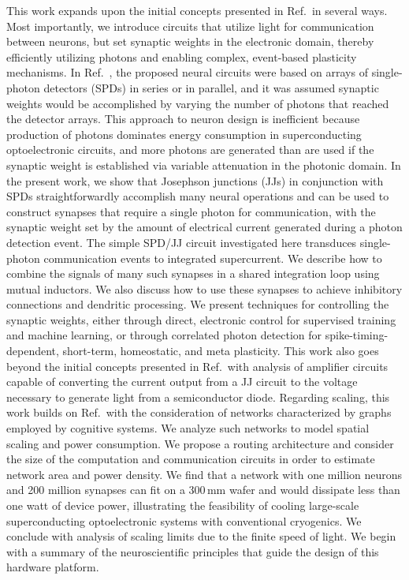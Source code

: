\documentclass[twocolumn]{article}
\newcommand{\onlinecite}[1]{\hspace{-1 ex} \nocite{#1}\citenum{#1}}
\begin{document}
This work expands upon the initial concepts presented in Ref.\,\onlinecite{shbu2017} in several ways. Most importantly, we introduce circuits that utilize light for communication between neurons, but set synaptic weights in the electronic domain, thereby efficiently utilizing photons and enabling complex, event-based plasticity mechanisms. In Ref.\,\onlinecite{shbu2017}, the proposed neural circuits were based on arrays of single-photon detectors (SPDs) in series or in parallel, and it was assumed synaptic weights would be accomplished by varying the number of photons that reached the detector arrays. This approach to neuron design is inefficient because production of photons dominates energy consumption in superconducting optoelectronic circuits, and more photons are generated than are used if the synaptic weight is established via variable attenuation in the photonic domain. In the present work, we show that Josephson junctions (JJs) in conjunction with SPDs straightforwardly accomplish many neural operations and can be used to construct synapses that require a single photon for communication, with the synaptic weight set by the amount of electrical current generated during a photon detection event. The simple SPD/JJ circuit investigated here transduces single-photon communication events to integrated supercurrent. We describe how to combine the signals of many such synapses in a shared integration loop using mutual inductors. We also discuss how to use these synapses to achieve inhibitory connections and dendritic processing. We present techniques for controlling the synaptic weights, either through direct, electronic control for supervised training and machine learning, or through correlated photon detection for spike-timing-dependent, short-term, homeostatic, and meta plasticity. This work also goes beyond the initial concepts presented in Ref.\,\onlinecite{shbu2017} with analysis of amplifier circuits capable of converting the current output from a JJ circuit to the voltage necessary to generate light from a semiconductor diode. Regarding scaling, this work builds on Ref.\,\onlinecite{shbu2017} with the consideration of networks characterized by graphs employed by cognitive systems. We analyze such networks to model spatial scaling and power consumption. We propose a routing architecture and consider the size of the computation and communication circuits in order to estimate network area and power density. We find that a network with one million neurons and 200 million synapses can fit on a 300\,mm wafer and would dissipate less than one watt of device power, illustrating the feasibility of cooling large-scale superconducting optoelectronic systems with conventional cryogenics. We conclude with analysis of scaling limits due to the finite speed of light. We begin with a summary of the neuroscientific principles that guide the design of this hardware platform.
	
\end{document}

